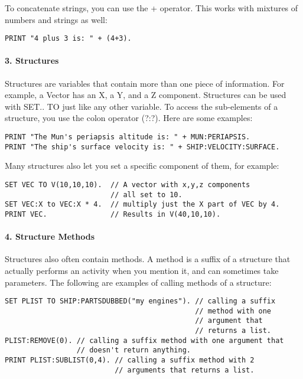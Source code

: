 To concatenate strings, you can use the + operator. This works with mixtures of numbers and strings as well:

\begin{Verbatim}[frame=single]
PRINT "4 plus 3 is: " + (4+3).
\end{Verbatim}

\paragraph{3. Structures}
Structures are variables that contain more than one piece of information. For example, a Vector has an X, a Y, and a Z component. Structures can be used with SET.. TO just like any other variable. To access the sub-elements of a structure, you use the colon operator (?:?). Here are some examples:

\begin{Verbatim}[frame=single]
PRINT "The Mun's periapsis altitude is: " + MUN:PERIAPSIS.
PRINT "The ship's surface velocity is: " + SHIP:VELOCITY:SURFACE.
\end{Verbatim}

Many structures also let you set a specific component of them, for example:

\begin{Verbatim}[frame=single]
SET VEC TO V(10,10,10).  // A vector with x,y,z components
                         // all set to 10.
SET VEC:X to VEC:X * 4.  // multiply just the X part of VEC by 4.
PRINT VEC.               // Results in V(40,10,10).
\end{Verbatim}

\paragraph{4. Structure Methods}
Structures also often contain methods. A method is a suffix of a structure that actually performs an activity when you mention it, and can sometimes take parameters. The following are examples of calling methods of a structure:

\begin{Verbatim}[frame=single]
SET PLIST TO SHIP:PARTSDUBBED("my engines"). // calling a suffix
                                             // method with one
                                             // argument that
                                             // returns a list.
PLIST:REMOVE(0). // calling a suffix method with one argument that
                 // doesn't return anything.
PRINT PLIST:SUBLIST(0,4). // calling a suffix method with 2
                          // arguments that returns a list.
\end{Verbatim}

